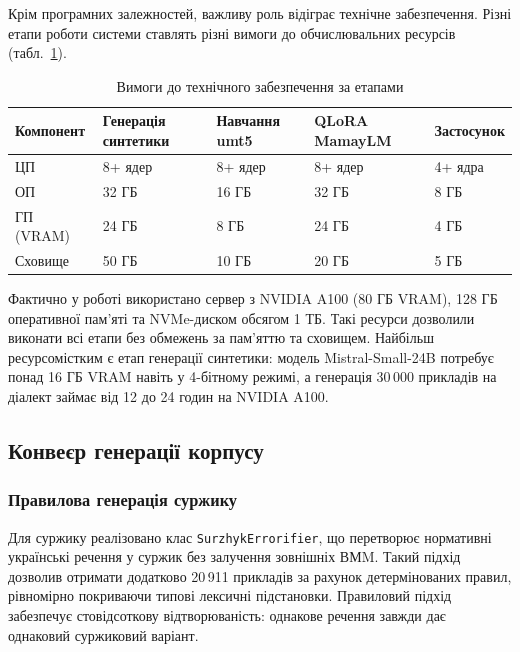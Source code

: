 \documentclass[14pt]{extarticle}
\begin{document}
Крім програмних залежностей, важливу роль відіграє технічне забезпечення. Різні етапи роботи системи ставлять різні вимоги до обчислювальних ресурсів (табл.~\ref{tab:hardware}).

\captionsetup[table]{justification=raggedleft}
\begin{table}[h]
\caption{Вимоги до технічного забезпечення за етапами}
\label{tab:hardware}
\setlength{\tabcolsep}{4pt}
\begin{tabular}{|p{}|p{}|p{}|p{}|p{}|}
\hline
\textbf{Компонент} & \textbf{Генерація синтетики} & \textbf{Навчання umt5} & \textbf{QLoRA MamayLM} & \textbf{Застосунок} \\
\hline
ЦП & 8+ ядер & 8+ ядер & 8+ ядер & 4+ ядра \\
\hline
ОП & 32 ГБ & 16 ГБ & 32 ГБ & 8 ГБ \\
\hline
ГП (VRAM) & 24 ГБ & 8 ГБ & 24 ГБ & 4 ГБ \\
\hline
Сховище & 50 ГБ & 10 ГБ & 20 ГБ & 5 ГБ \\
\hline
\end{tabular}
\end{table}

Фактично у роботі використано сервер з NVIDIA A100 (80 ГБ VRAM), 128 ГБ оперативної пам'яті та NVMe-диском обсягом 1 ТБ. Такі ресурси дозволили виконати всі етапи без обмежень за пам'яттю та сховищем. Найбільш ресурсомістким є етап генерації синтетики: модель Mistral-Small-24B потребує понад 16 ГБ VRAM навіть у 4-бітному режимі, а генерація 30\,000 прикладів на діалект займає від 12 до 24 годин на NVIDIA A100.

\subsection{Конвеєр генерації корпусу}

\subsubsection{Правилова генерація суржику}

Для суржику реалізовано клас \texttt{SurzhykErrorifier}, що перетворює нормативні українські речення у суржик без залучення зовнішніх ВМM. Такий підхід дозволив отримати додатково 20\,911 прикладів за рахунок детермінованих правил, рівномірно покриваючи типові лексичні підстановки. Правиловий підхід забезпечує стовідсоткову відтворюваність: однакове речення завжди дає однаковий суржиковий варіант.
\end{document}
